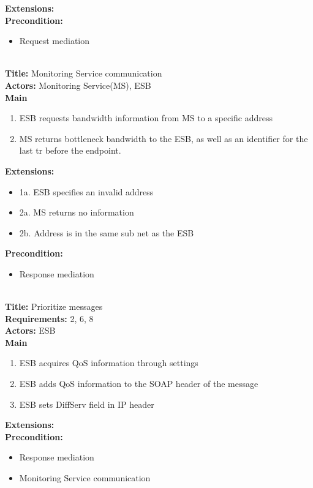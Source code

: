     \textbf{Extensions:} \\
    \textbf{Precondition:}
    \begin{itemize}
        \item Request mediation
    \end{itemize}
   ~\\
    \textbf{Title:} Monitoring Service communication\\
    \textbf{Actors:} Monitoring Service(MS), ESB\\
    \textbf{Main}
    \begin{enumerate}
        \item ESB requests bandwidth information from MS to a specific address
        \item MS returns bottleneck bandwidth to the ESB, as well as an identifier for the last \gls{tr} before the endpoint.
    \end{enumerate}
    \textbf{Extensions:}
    \begin{itemize}
        \item[]	1a. ESB specifies an invalid address
        \item[]	2a. MS returns no information
        \item[]	2b. Address is in the same sub net as the ESB
    \end{itemize}
    \textbf{Precondition:}
    \begin{itemize}
        \item Response mediation
    \end{itemize}
   ~\\
    \textbf{Title:} Prioritize messages\\
    \textbf{Requirements:} 2, 6, 8\\
    \textbf{Actors:} ESB\\
    \textbf{Main}
    \begin{enumerate}
        \item ESB acquires QoS information through settings
        \item ESB adds QoS information to the SOAP header of the message
        \item ESB sets DiffServ field in IP header
    \end{enumerate}
    \textbf{Extensions:}\\
    \textbf{Precondition:}
    \begin{itemize}
        \item Response mediation
        \item Monitoring Service communication
    \end{itemize}

